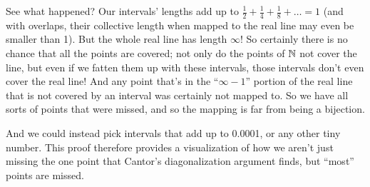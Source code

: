 \documentclass[11pt,twoside=off,numbers=noenddot]{scrbook}
\begin{document}
\begin{proofsketch}
\begin{figure}[h]
    \end{figure}

    See what happened? Our intervals' lengths add up to $\frac{1}{2} + \frac{1}{4} + \frac{1}{8} + \dots = 1$ (and with overlaps, their collective length when mapped to the real line may even be smaller than 1). But the whole real line has length $\infty$! So certainly there is no chance that all the points are covered; not only do the points of $\mathbb N$ not cover the line, but even if we fatten them up with these intervals, those intervals don't even cover the real line! And any point that's in the ``$\infty - 1$'' portion of the real line that is not covered by an interval was certainly not mapped to. So we have all sorts of points that were missed, and so the mapping is far from being a bijection.

    And we could instead pick intervals that add up to 0.0001, or any other tiny number. This proof therefore provides a visualization of how we aren't just missing the one point that Cantor's diagonalization argument finds, but ``most'' points are missed.
\end{proofsketch}
\end{document}
